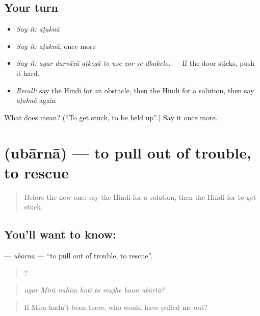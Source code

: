 \subsection*{Your turn}
\begin{itemize}
\raggedright
  \item \emph{Say it:} \emph{aṭaknā}
  \item \emph{Say it:} \emph{aṭaknā}, once more
  \item \emph{Say it:} \emph{agar darvāzā aṭkegā to use zor se dhakelo.} — If the door sticks, push it hard.
  \item \emph{Recall:} say the Hindi for an obstacle, then the Hindi for a solution, then say \emph{aṭaknā} again
\end{itemize}

\begin{tcolorbox}[breakable,colback=teal!4,colframe=teal!35!black,title={Before you move on}]
What does  mean? (\textquotedblleft{}To get stuck, to be held up\textquotedblright{}.) Say it once more.
\end{tcolorbox}
\section[\texorpdfstring{\hi{उबारना} (ubārnā)}{उबारना (ubārnā)}]{ (ubārnā) — to pull out of trouble, to rescue}

\label{lesson:HI-C380-ubarna}



\begin{quote}
Before the new one: say the Hindi for a solution, then the Hindi for to get stuck.
\end{quote}

\subsection*{You'll want to know: }
\textbf{} — \emph{ubārnā} — \textquotedblleft{}to pull out of trouble, to rescue\textquotedblright{}.

\begin{quote}
       ?
\end{quote}

\begin{quote}
\emph{agar Mīrā nahīṃ hotī to mujhe kaun ubārtā?}
\end{quote}

\begin{quote}
If Mira hadn't been there, who would have pulled me out?
\end{quote}

